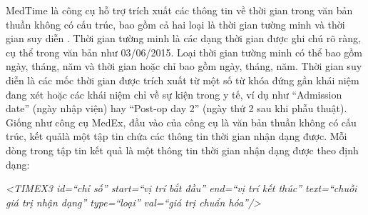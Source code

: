 MedTime là công cụ hỗ trợ trích xuất các thông tin về thời gian trong văn bản thuần không có cấu trúc, bao gồm cả hai loại là thời gian tường minh và thời gian suy diễn \cite{Sohn2013}. Thời gian tường minh là các dạng thời gian được ghi chú rõ ràng, cụ thể trong văn bản như 03/06/2015. Loại thời gian tường minh có thể bao gồm ngày, tháng, năm và thời gian hoặc chỉ bao gồm ngày, tháng, năm. Thời gian suy diễn là các mốc thời gian được trích xuất từ một số từ khóa đứng gần khái niệm đang xét hoặc các khái niệm chỉ về sự kiện trong y tế, ví dụ như ``Admission date'' (ngày nhập viện) hay ``Post-op day 2'' (ngày thứ 2 sau khi phẫu thuật). Giống như công cụ MedEx, đầu vào của công cụ là văn bản thuần không có cấu trúc, kết quảlà một tập tin chứa các thông tin thời gian nhận dạng được. Mỗi dòng trong tập tin kết quả là một thông tin thời gian nhận dạng được theo định dạng:

\begin{center}
\textit{<TIMEX3 id=``chỉ số'' start=``vị trí bắt đầu'' end=``vị trí kết thúc'' text=``chuỗi giá trị nhận dạng'' type=``loại'' val=``giá trị chuẩn hóa''/>}\\
\end{center}
